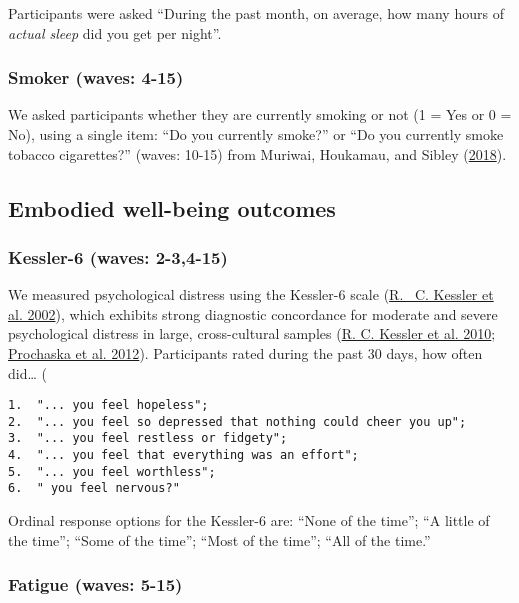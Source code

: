 \documentclass[
  singlecolumn]{report}
\begin{document}
Participants were asked ``During the past month, on average, how many
hours of \emph{actual sleep} did you get per night''.

\hypertarget{smoker-waves-4-15}{%
\subsubsection{Smoker (waves: 4-15)}\label{smoker-waves-4-15}}

We asked participants whether they are currently smoking or not (1 = Yes
or 0 = No), using a single item: ``Do you currently smoke?'' or ``Do you
currently smoke tobacco cigarettes?'' (waves: 10-15) from Muriwai,
Houkamau, and Sibley
(\protect\hyperlink{ref-muriwai_looking_2018}{2018}).

\hypertarget{embodied-well-being-outcomes}{%
\subsection{Embodied well-being
outcomes}\label{embodied-well-being-outcomes}}

\hypertarget{kessler-6-waves-2-34-15}{%
\subsubsection{Kessler-6 (waves:
2-3,4-15)}\label{kessler-6-waves-2-34-15}}

We measured psychological distress using the Kessler-6 scale
(\protect\hyperlink{ref-kessler2002}{R. ~C. Kessler et al. 2002}), which
exhibits strong diagnostic concordance for moderate and severe
psychological distress in large, cross-cultural samples
(\protect\hyperlink{ref-kessler2010}{R. C. Kessler et al. 2010};
\protect\hyperlink{ref-prochaska2012}{Prochaska et al. 2012}).
Participants rated during the past 30 days, how often did\ldots{} (

\begin{verbatim}
1.  "... you feel hopeless";
2.  "... you feel so depressed that nothing could cheer you up";
3.  "... you feel restless or fidgety";
4.  "... you feel that everything was an effort";
5.  "... you feel worthless";
6.  " you feel nervous?"
\end{verbatim}

Ordinal response options for the Kessler-6 are: ``None of the time'';
``A little of the time''; ``Some of the time''; ``Most of the time'';
``All of the time.''

\hypertarget{fatigue-waves-5-15}{%
\subsubsection{Fatigue (waves: 5-15)}\label{fatigue-waves-5-15}}
\end{document}

